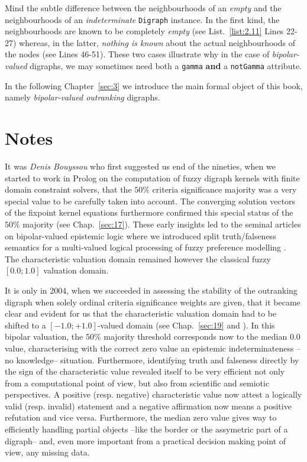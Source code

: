 Mind the subtle difference between the neighbourhoods of an \emph{empty} and the neighbourhoods of an \emph{indeterminate} \texttt{Digraph} instance. In the first kind, the neighbourhoods are known to be completely \emph{empty}  (see List.~\vref{list:2.11} Lines 22-27) whereas, in the latter, \emph{nothing is known} about the actual neighbourhoods of the nodes  (see Lines 46-51). These two cases illustrate why in the case of \emph{bipolar-valued} digraphs, we may sometimes need both a \texttt{gamma} \textbf{and} a \texttt{notGamma} attribute.

\vspace{\baselineskip}
In the following Chapter~\ref{sec:3}  we introduce the main formal object of this book, namely \emph{bipolar-valued outranking} digraphs.

{}
\section*{Notes}

It was \emph{Denis Bouyssou}  who first suggested us end of the nineties, when we started to work in Prolog on the computation of fuzzy digraph kernels with finite domain constraint solvers, that the $50\%$ criteria significance majority was a very special value to be carefully taken into account. The converging solution vectors of the fixpoint kernel equations furthermore confirmed this special status of the $50\%$ majority (see Chap.~\ref{sec:17}). These early insights led to the seminal articles on bipolar-valued epistemic logic where we introduced split truth/falseness semantics for a multi-valued logical processing of fuzzy preference modelling \citep{BIS-2000,BIS-2002}. The characteristic valuation domain remained however the classical fuzzy $[0.0;1.0]$ valuation domain.

It is only in 2004, when we succeeded in assessing the stability of the outranking digraph when solely ordinal criteria significance weights are given, that it became clear and evident for us that the characteristic valuation domain had to be shifted to a $[-1.0;+1.0]$-valued domain (see Chap.~\ref{sec:19} and \citet{BIS-2004a}). In this bipolar valuation, the $50\%$ majority threshold corresponds now to the median $0.0$ value, characterising with the correct zero value an epistemic indeterminateness --no knowledge-- situation. Furthermore, identifying truth and falseness directly by the sign of the characteristic value revealed itself to be very efficient not only from a computational point of view, but also from scientific and semiotic perspectives. A positive (resp. negative) characteristic value now attest a logically valid (resp. invalid) statement and a negative affirmation now means a positive refutation and vice versa. Furthermore, the median zero value gives way to efficiently handling partial objects --like the border or the assymetric part of a digraph-- and, even more important from a practical decision making point of view, any missing data.

